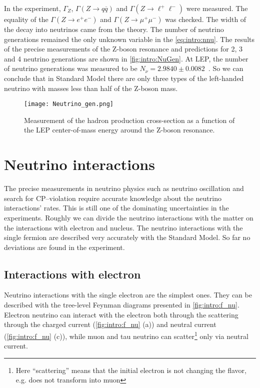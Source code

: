 \documentclass[../main.tex]{subfiles}
\begin{document}
In the experiment, $\Gamma_Z$, $\Gamma(Z\to q\overline{q})$ and $\Gamma(Z\to \ell^+\ell^-)$ were measured. The equality of the $\Gamma(Z\to e^+e^-)$ and $\Gamma(Z\to \mu^+\mu^-)$ was checked. The width of the decay into neutrinos came from the theory. The number of neutrino generations remained the only unknown variable in the \autoref{eq:intro:nnu}. The results of the precise measurements of the Z-boson resonance and predictions for 2, 3 and 4 neutrino generations are shown in \autoref{fig:intro:NuGen}. At LEP, the number of neutrino generations was measured to be $N_{\nu}=2.9840\pm0.0082$~\cite{Bagger2006}. So we can conclude that in Standard Model there are only three types of the left-handed neutrino with masses less than half of the Z-boson mass.

\begin{figure}[!ht]
    \centering
    \texttt{[image: Neutrino\_gen.png]}
    \caption{Measurement of the hadron production cross-section as a function of the LEP center-of-mass energy around the Z-boson resonance.}
    \label{fig:intro:NuGen}
\end{figure}

\section{Neutrino interactions}
The precise measurements in neutrino physics such as neutrino oscillation and search for CP--violation require accurate knowledge about the neutrino interactions' rates. This is still one of the dominating uncertainties in the experiments. Roughly we can divide the neutrino interactions with the matter on the interactions with electron and nucleus. The neutrino interactions with the single fermion are described very accurately with the Standard Model. So far no deviations are found in the experiment.

\subsection{Interactions with electron}
Neutrino interactions with the single electron are the simplest ones. They can be described with the tree-level Feynman diagrams presented in \autoref{fig:intro:f_nu}. Electron neutrino can interact with the electron both through the scattering through the charged current (\autoref{fig:intro:f_nu} (a)) and neutral current (\autoref{fig:intro:f_nu} (c)), while muon and tau neutrino can scatter\footnote{Here ``scattering'' means that the initial electron is not changing the flavor, e.g. does not transform into muon} only via neutral current.
\end{document}
